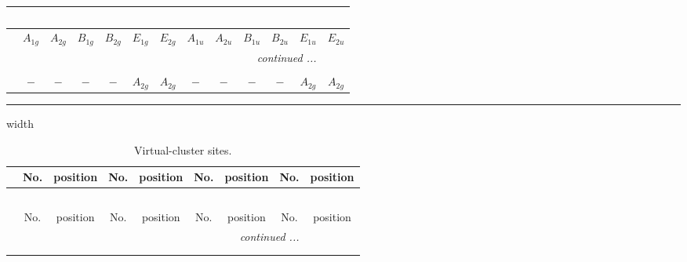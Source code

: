 \documentclass[fleqn,10pt,landscape]{article}
\begin{document}
\begin{itemize}
\begin{center}
\begin{longtable}{ccccccccccccc}
\multicolumn{12}{l}{\tablename\ \thetable{}} \\
 \hline \hline
 & $ A_{1g} $ & $ A_{2g} $ & $ B_{1g} $ & $ B_{2g} $ & $ E_{1g} $ & $ E_{2g} $ & $ A_{1u} $ & $ A_{2u} $ & $ B_{1u} $ & $ B_{2u} $ & $ E_{1u} $ & $ E_{2u} $ \\ \hline \endhead

 \hline \hline
\multicolumn{12}{r}{\footnotesize\it continued ...} \\ \endfoot

 \hline \hline
\multicolumn{12}{r}{} \\ \endlastfoot

$  $ & $ - $ & $ - $ & $ - $ & $ - $ & $ A_{2g} $ & $ A_{2g} $ & $ - $ & $ - $ & $ - $ & $ - $ & $ A_{2g} $ & $ A_{2g} $ \\
\end{longtable}
\end{center}

 \hfil \hrule height 1mm width \textwidth \hfil

{
\scriptsize
\begin{center}
\renewcommand{\arraystretch}{1.7}
\begin{longtable}{ccccccccc}
\caption{Virtual-cluster sites.}
 \\
 \hline \hline
 & No. & position & No. & position & No. & position & No. & position \\ \hline \endfirsthead

\multicolumn{8}{l}{\tablename\ \thetable{}} \\
 \hline \hline
 & No. & position & No. & position & No. & position & No. & position \\ \hline \endhead

 \hline \hline
\multicolumn{8}{r}{\footnotesize\it continued ...} \\ \endfoot

 \hline \hline
\multicolumn{8}{r}{} \\ \endlastfoot


\end{longtable}
\end{center}}
\end{itemize}
\end{document}
